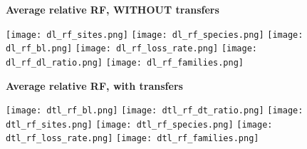 \documentclass[12pt,a4paper]{article}
\begin{document}
\newcommand*{\figuretitle}[1]{%
    {\centering%
    \textbf{#1}%
    \par\medskip}%
}



\begin{figure}
\figuretitle{Average relative RF, WITHOUT transfers}
\texttt{[image: dl\_rf\_sites.png]}
\texttt{[image: dl\_rf\_species.png]}
\texttt{[image: dl\_rf\_bl.png]}
\texttt{[image: dl\_rf\_loss\_rate.png]}
\texttt{[image: dl\_rf\_dl\_ratio.png]}
\texttt{[image: dl\_rf\_families.png]}
\end{figure}


\begin{figure}
\figuretitle{Average relative RF, with transfers}
\texttt{[image: dtl\_rf\_bl.png]}
\texttt{[image: dtl\_rf\_dt\_ratio.png]}
\texttt{[image: dtl\_rf\_sites.png]}
\texttt{[image: dtl\_rf\_species.png]}
\texttt{[image: dtl\_rf\_loss\_rate.png]}
\texttt{[image: dtl\_rf\_families.png]}
\end{figure}
\end{document}
